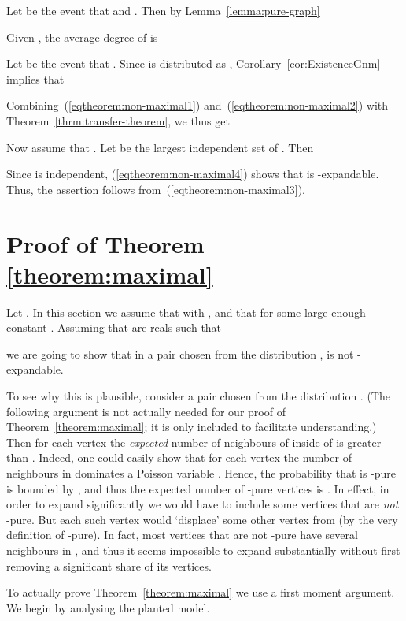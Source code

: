 \documentclass[a4paper,10pt]{article}
\newcommand{\qed}{\hfill\smallskip}
\newcommand\Lem{Lemma}
\newcommand\Thm{Theorem}
\newcommand\Cor{Corollary}
\begin{document}
Let  be the event that  and
. Then by \Lem~\ref{lemma:pure-graph}

Given , the average degree of  is

Let  be the event that .
Since  is distributed as , \Cor~\ref{cor:ExistenceGnm} 
implies that

Combining~(\ref{eqtheorem:non-maximal1}) and~(\ref{eqtheorem:non-maximal2}) with \Thm~\ref{thrm:transfer-theorem}, we thus get
	

\noindent
Now assume that .
Let  be the largest independent set of .
Then
	
Since  is independent, (\ref{eqtheorem:non-maximal4}) shows that  is
	-expandable.
Thus, the assertion follows from~(\ref{eqtheorem:non-maximal3}).
\qed





\section{Proof of Theorem \ref{theorem:maximal}}\label{section:theorem:maximal}



Let .
In this section we assume that  with ,
	and that  for some large enough constant .
Assuming that  are reals such that
	
we are going to show that in a pair  chosen from the distribution ,
 is not -expandable.

To see why this is plausible, consider a pair  chosen from the distribution .
(The following argument is not actually needed for our proof of \Thm~\ref{theorem:maximal}; it is only included
	to facilitate understanding.)
Then for each vertex  the \emph{expected} number of neighbours of 
inside of  is greater than .
Indeed, one could easily show that for each vertex  the number of neighbours in 
dominates a Poisson variable .
Hence, the probability that  is -pure is bounded by
	,
and thus the expected number of -pure vertices is .
In effect, in order to expand  significantly we would have to include some
vertices that are \emph{not} -pure.
But each such vertex would `displace' some other vertex from 
	(by the very definition of -pure).
In fact, most vertices that are not -pure have several neighbours in ,
and thus it seems impossible to expand  substantially without first removing
a significant share of its vertices.

To actually prove \Thm~\ref{theorem:maximal} we use a first moment argument.
We begin by analysing the planted model.
\end{document}
